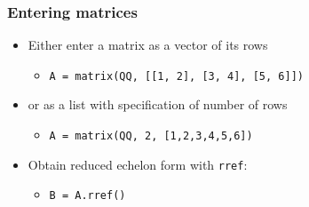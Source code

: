 \documentclass[11pt,ignorenonframetext,]{beamer}
\begin{document}
\begin{frame}\frametitle{Entering matrices}

\begin{itemize}
\itemsep1pt\parskip0pt
\item
  Either enter a matrix as a vector of its rows

  \begin{itemize}
  \itemsep1pt\parskip0pt
  \item
    \texttt{A = matrix(QQ, [[1, 2], [3, 4], [5, 6]])}
  \end{itemize}
\item
  or as a list with specification of number of rows

  \begin{itemize}
  \itemsep1pt\parskip0pt
  \item
    \texttt{A = matrix(QQ, 2, [1,2,3,4,5,6])}
  \end{itemize}
\item
  Obtain reduced echelon form with \texttt{rref}:

  \begin{itemize}
  \itemsep1pt\parskip0pt
  \item
    \texttt{B = A.rref()}
  \end{itemize}
\end{itemize}

\end{frame}
\end{document}
